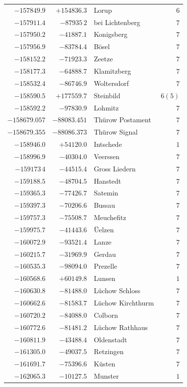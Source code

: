 \begin{center}
\begin{tabular}{r|r|p{170pt}|r}
\(-157849.9\)&\(+154836.3\)&Lorup&\(6\)\\
\(-157911.4\)&\(-87935\,2\)&bei Lichtenberg&\(7\)\\
\(-157950.2\)&\(-41887.1\)&Konigsberg&\(7\)\\
\(-157956.9\)&\(-83784.4\)&Bösel&\(7\)\\
\(-158152.2\)&\(-71923.3\)&Zeetze&\(7\)\\
\(-158177.3\)&\(-64888.7\)&Klamitzberg&\(7\)\\
\(-158532.4\)&\(-86746.9\)&Woltersdorf&\(7\)\\
\(-158590.5\)&\(+177559.7\)&Steinbild&\(6 (5)\)\\
\(-158592.2\)&\(-97830.9\)&Lohmitz&\(7\)\\
\(-158679.057\)&\(-88083.451\)&Thürow Postament&\(7\)\\
\(-158679.355\)&\(-88086.373\)&Thürow Signal&\(7\)\\
\(-158946.0\)&\(+54120.0\)&Intschede&\(1\)\\
\(-158996.9\)&\(-40304.0\)&Veerssen&\(7\)\\
\(-159173\,4\)&\(-44515.4\)&Gross Liedern&\(7\)\\
\(-159188.5\)&\(-48704.5\)&Hanstedt&\(7\)\\
\(-159365.3\)&\(-77426.7\)&Satemin&\(7\)\\
\(-159397.3\)&\(-70206.6\)&Bussau&\(7\)\\
\(-159757.3\)&\(-75508.7\)&Meuchefitz&\(7\)\\
\(-159975.7\)&\(-41443.6\)&Üelzen&\(7\)\\
\(-160072.9\)&\(-93521.4\)&Lanze&\(7\)\\
\(-160215.7\)&\(-31969.9\)&Gerdau&\(7\)\\
\(-160535.3\)&\(-98094.0\)&Prezelle&\(7\)\\
\(-160568.6\)&\(+60149.8\)&Lunsen&\(1\)\\
\(-160630.8\)&\(-81488.0\)&Lüchow Schloss&\(7\)\\
\(-160662.6\)&\(-81583.7\)&Lüchow Kirchthurm&\(7\)\\
\(-160720.2\)&\(-84088.0\)&Colborn&\(7\)\\
\(-160772.6\)&\(-81481.2\)&Lüchow Rathhaus&\(7\)\\
\(-160811.9\)&\(-43488.4\)&Oldenstadt&\(7\)\\
\(-161305.0\)&\(-49037.5\)&Retzingen&\(7\)\\
\(-161691.7\)&\(-75396.6\)&Küsten&\(7\)\\
\(-162065.3\)&\(-10127.5\)&Munster&\(1\)\\
\hline\end{tabular}\endgroup\end{center}
